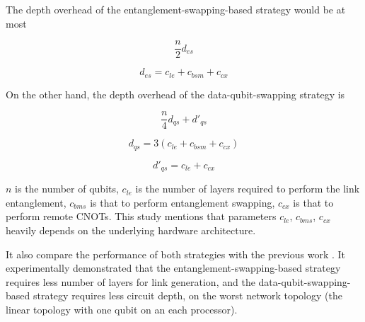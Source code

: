  The depth overhead of the entanglement-swapping-based strategy would be at most 
 
  \begin{equation}
 \frac{n}{2}d_{es}
  \end{equation}
  
 \begin{equation}
 d_{es} = c_{le} + c_{bsm} + c_{cx}
  \end{equation} 
 
  On the other hand, the depth overhead of the data-qubit-swapping strategy is
  
   \begin{equation} 
  \frac{n}{4}d_{qs} + d'_{qs}
   \end{equation} 
   
   \begin{equation} 
   d_{qs} = 3(c_{le} + c_{bsm} + c_{cx})
    \end{equation}
    
  \begin{equation}
   d'_{qs} = c_{le} + c_{cx}
   \end{equation}
  
  $n$ is the number of qubits, $c_{le}$ is the number of layers required to perform the link entanglement, $c_{bms}$ is that to perform entanglement swapping, $c_{cx}$ is that to perform remote CNOTs.
  This study mentions that parameters $c_{le}$, $c_{bms}$, $c_{cx}$ heavily depends on the underlying hardware architecture.
  
  It also compare the performance of both strategies with the previous work \cite{hypergraph}.  It experimentally demonstrated that the entanglement-swapping-based strategy requires less number of layers for link generation, and the data-qubit-swapping-based strategy requires less circuit depth, on the worst network topology (the linear topology with one qubit on an each processor).


